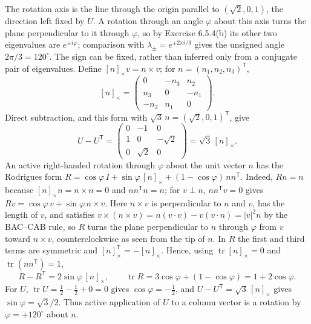 The rotation axis is the line through the origin parallel to
$(\sqrt2,0,1)$, the direction left fixed by $U$. A rotation through an
angle $\varphi$ about this axis turns the plane perpendicular to it
through $\varphi$, so by Exercise 6.5.4(b) its other two eigenvalues
are $e^{\pm i\varphi}$;
comparison with $\lambda_\pm=e^{\pm2\pi i/3}$ gives the unsigned angle
$2\pi/3=120^\circ$.
The sign can be fixed, rather than inferred only from a conjugate pair
of eigenvalues. Define $[n]_\times v=n\times v$; for
$n=(n_1,n_2,n_3)^{\mathsf T}$,
\[
[n]_\times=\begin{pmatrix}0&-n_3&n_2\\n_3&0&-n_1\\-n_2&n_1&0\end{pmatrix}.
\]
Direct subtraction, and this form with $\sqrt3\,n=(\sqrt2,0,1)^{\mathsf T}$,
give
\[
U-U^{\mathsf T}
=\begin{pmatrix}0&-1&0\\1&0&-\sqrt2\\0&\sqrt2&0\end{pmatrix}
=\sqrt3\,[n]_\times.
\]
An active right-handed rotation through $\varphi$ about the unit
vector $n$ has the Rodrigues form
$R=\cos\varphi\,I+\sin\varphi\,[n]_\times+(1-\cos\varphi)\,nn^{\mathsf T}$.
Indeed, $Rn=n$ because $[n]_\times n=n\times n=0$ and
$nn^{\mathsf T}n=n$; for $v\perp n$, $nn^{\mathsf T}v=0$ gives
$Rv=\cos\varphi\,v+\sin\varphi\,n\times v$. Here $n\times v$ is
perpendicular to $n$ and $v$, has the length of $v$, and satisfies
$v\times(n\times v)=n(v\cdot v)-v(v\cdot n)=|v|^2n$ by the BAC--CAB
rule, so $R$ turns the plane perpendicular to
$n$ through $\varphi$ from $v$ toward $n\times v$, counterclockwise as
seen from the tip of $n$. In $R$ the first and third terms are
symmetric and $[n]_\times^{\mathsf T}=-[n]_\times$. Hence, using
$\operatorname{tr}[n]_\times=0$ and $\operatorname{tr}(nn^{\mathsf T})=1$,
\[
R-R^{\mathsf T}=2\sin\varphi\,[n]_\times,\qquad
\operatorname{tr}R=3\cos\varphi+(1-\cos\varphi)=1+2\cos\varphi.
\]
For $U$, $\operatorname{tr}U=\tfrac12-\tfrac12+0=0$ gives
$\cos\varphi=-\tfrac12$, and $U-U^{\mathsf T}=\sqrt3\,[n]_\times$ gives
$\sin\varphi=\sqrt3/2$. Thus active application of $U$ to a column
vector is a rotation by $\varphi=+120^\circ$ about $n$.
